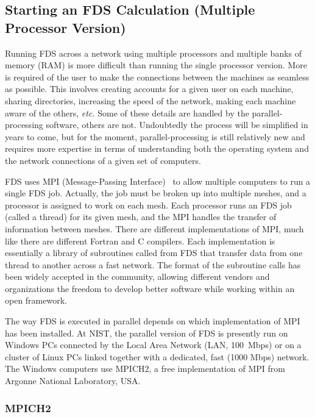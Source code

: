 \documentclass[11pt]{book}
\begin{document}
\subsection{Starting an FDS Calculation (Multiple Processor Version)}
\label{info:parallelprocessing}

Running FDS across a network using multiple processors and multiple
banks of memory (RAM) is more difficult than running the single
processor version.  More is required of the user to make the
connections between the machines as seamless as possible. This
involves creating accounts for a given user on each machine, sharing
directories, increasing the speed of the network, making each machine
aware of the others, {\em etc.}  Some of these details are handled by
the parallel-processing software, others are not. Undoubtedly the
process will be simplified in years to come, but for the moment,
parallel-processing is still relatively new and requires more
expertise in terms of understanding both the operating system and the
network connections of a given set of computers.

FDS uses MPI (Message-Passing Interface)~\cite{Gropp:1} to allow
multiple computers to run a single FDS job. Actually, the job must be
broken up into multiple meshes, and a processor is assigned to work on
each mesh. Each processor runs an FDS job (called a thread) for its
given mesh, and the MPI handles the transfer of information between
meshes.  There are different implementations of MPI, much like there
are different Fortran and C compilers. Each implementation is
essentially a library of subroutines called from FDS that transfer
data from one thread to another across a fast network. The format of
the subroutine calls has been widely accepted in the community,
allowing different vendors and organizations the freedom to develop
better software while working within an open framework.

The way FDS is executed in parallel depends on which implementation of
MPI has been installed.  At NIST, the parallel version of FDS is
presently run on Windows PCs connected by the Local Area Network (LAN,
100~Mbps) or on a cluster of Linux PCs linked together with a
dedicated, fast (1000 Mbps) network.  The Windows computers use
MPICH2, a free implementation of MPI from Argonne National Laboratory,
USA.

\subsubsection{MPICH2}
\end{document}
